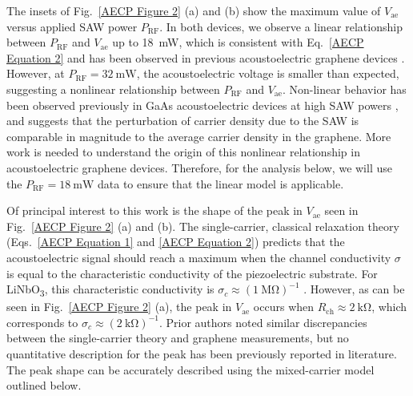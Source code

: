 \documentclass[double,12pt,1in,seploa]{beavtex}
\begin{document}
The insets of Fig.\ \ref{AECP Figure 2} (a) and (b) show the maximum value of $V_{\mathrm{ae}}$ versus applied SAW power $P_{\mathrm{RF}}$. In both devices, we observe a linear relationship between $P_{\mathrm{RF}}$ and $V_{\mathrm{ae}}$ up to \SI{18}{\milli\watt}, which is consistent with Eq.\ \ref{AECP Equation 2} and has been observed in previous acoustoelectric graphene devices \cite{bandhu_macroscopic_2013}. However, at $P_{\mathrm{RF}}=\SI{32}{\milli\watt}$, the acoustoelectric voltage is smaller than expected, suggesting a nonlinear relationship between $P_{\mathrm{RF}}$ and $V_{\mathrm{ae}}$. Non-linear behavior has been observed previously in GaAs acoustoelectric devices at high SAW powers \cite{rotter_nonlinear_1999}, and suggests that the perturbation of carrier density due to the SAW is comparable in magnitude to the average carrier density in the graphene. More work is needed to understand the origin of this nonlinear relationship in acoustoelectric graphene devices. Therefore, for the analysis below, we will use the $P_{\mathrm{RF}} = \SI{18}{\milli\watt}$ data to ensure that the linear model is applicable. 

Of principal interest to this work is the shape of the peak in $V_{\mathrm{ae}}$ seen in Fig.\ \ref{AECP Figure 2} (a) and (b). The single-carrier, classical relaxation theory (Eqs.\ \ref{AECP Equation 1} and \ref{AECP Equation 2}) predicts that the acoustoelectric signal should reach a maximum when the channel conductivity $\sigma$ is equal to the characteristic conductivity of the piezoelectric substrate. For LiNbO\textsubscript{3}, this characteristic conductivity is $\sigma_c \approx (\SI{1}{\mega\ohm})^{-1}$ \cite{wixforth_surface_1989,rotter_giant_1998}. However, as can be seen in Fig.\ \ref{AECP Figure 2} (a), the peak in $V_{\mathrm{ae}}$ occurs when $R_{\mathrm{ch}} \approx \SI{2}{\kilo\ohm}$, which corresponds to $\sigma_c \approx (\SI{2}{\kilo\ohm})^{-1}$. Prior authors noted similar discrepancies between the single-carrier theory and graphene measurements, but no quantitative description for the peak has been previously reported in literature. The peak shape can be accurately described using the mixed-carrier model outlined below.
\end{document}
